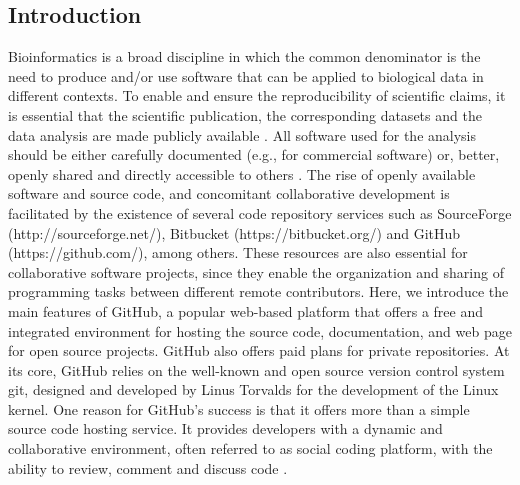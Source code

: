 \documentclass[10pt,letterpaper]{article}
\begin{document}

\linenumbers

\subsection*{Introduction}\label{introduction}

Bioinformatics is a broad discipline in which the common denominator is
the need to produce and\slash or use software that can be applied to
biological data in different contexts. To enable and ensure the
reproducibility of scientific claims, it is essential that the
scientific publication, the corresponding datasets and the data analysis
are made publicly available \cite{Goodman:2014,Perez-Riverol:2015}. All
software used for the analysis should be either carefully documented
(e.g., for commercial software) or, better, openly shared and directly
accessible to others \cite{Osborne:2014,Vihinen:2015}. The rise of
openly available software and source code, and concomitant collaborative
development is facilitated by the existence of several code repository
services such as SourceForge (http://sourceforge.net/), Bitbucket
(https://bitbucket.org/) and GitHub (https://github.com/), among others.
These resources are also essential for collaborative software projects,
since they enable the organization and sharing of programming tasks
between different remote contributors. Here, we introduce the main
features of GitHub, a popular web-based platform that offers a free and
integrated environment for hosting the source code, documentation, and
web page for open source projects. GitHub also offers paid plans for
private repositories. At its core, GitHub relies on the well-known and
open source version control system git, designed and developed by Linus
Torvalds for the development of the Linux kernel. One reason for
GitHub's success is that it offers more than a simple source code
hosting service. It provides developers with a dynamic and collaborative
environment, often referred to as social coding platform, with the ability to
review, comment and discuss code \cite{Dabbish:2012}.
\end{document}
